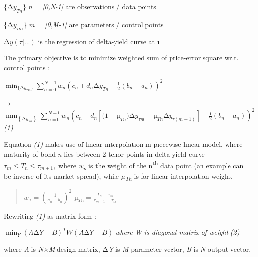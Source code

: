 \({\{\mathrm{\Delta}y}_{Tn}\}\) \emph{n = {[}0,N-1{]}} are observations
/ data points

\{\({\mathrm{\Delta}y}_{\tau m}\)\} \emph{m = {[}0,M-1{]}} are
parameters / control points

\(\mathrm{\Delta}y\left( \tau|\ldots \right)\) is the regression of
delta-yield curve at τ

The primary objective is to minimize weighted sum of price-error square
wr.t. control points :

\(\min_{\{\mathrm{\Delta}y_{\tau m}\}}\sum_{n = 0}^{N - 1}{w_{n}\left( c_{n} + d_{n}{\mathrm{\Delta}y}_{Tn} - \frac{1}{2}(b_{n} + a_{n}) \right)^{2}}\)

→
\(\min_{\left\{ {\mathrm{\Delta}y}_{\tau m} \right\}}\sum_{n = 0}^{N - 1}{w_{n}\left( c_{n} + d_{n}\left\lbrack {(1 - µ}_{Tn}){\mathrm{\Delta}y}_{\tau m} + µ_{Tn}{\mathrm{\Delta}y}_{\tau(m + 1)} \right\rbrack - \frac{1}{2}(b_{n} + a_{n}) \right)}^{2}\)
\emph{(1)}

Equation \emph{(1)} makes use of linear interpolation in piecewise
linear model, where maturity of bond \emph{n} lies between 2 tenor
points in delta-yield curve \(\tau_{m} \leq T_{n} \leq \tau_{m + 1},\)
where \emph{w\textsubscript{n}} is the weight of the
n\textsuperscript{th} data point (an example can be inverse of its
market spread), while \emph{µ\textsubscript{Tn}} is for linear
interpolation weight.

\begin{quote}
\(w_{n} = \left( \frac{1}{a_{n} - b_{n}} \right)^{2}\)
\(µ_{Tn} = \frac{T_{n} - \tau_{m}}{\tau_{m + 1} - \tau_{m}}\)
\end{quote}

Rewriting \emph{(1)} as matrix form :

\(\min_{Y}(A\mathrm{\Delta}Y - B)^{T}W(A\mathrm{\Delta}Y - B)\)
\emph{where W is diagonal matrix of weight} \emph{(2)}

where \emph{A} is \emph{N×M} design matrix, \(\mathrm{\Delta}\)\emph{Y}
is \emph{M} parameter vector, \emph{B} is \emph{N} output vector.


